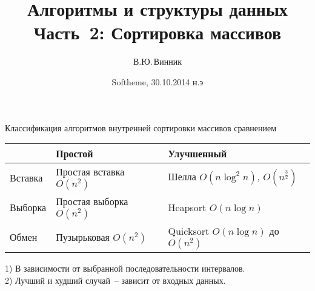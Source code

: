 \documentclass[landscape]{slides}
\begin{document}
\author{В.Ю.\,Винник}

\title{Алгоритмы и структуры данных\\
Часть~2: Сортировка массивов}

\date{Softheme, 30.10.2014 н.э}

\maketitle

\begin{slide}
  Классификация алгоритмов внутренней сортировки массивов сравнением
  \begin{center}
    \renewcommand{\arraystretch}{2}
    \begin{tabular}{|l|l|l|}
      \hline
      {}&
      Простой&
      Улучшенный
      \\
      \hline
      Вставка&
      Простая вставка $O(n^2)$&
      Шелла\textonesuperior{} $O(n\log^2n)$, $O(n^\frac{3}{2})$
      \\
      \hline
      Выборка&
      Простая выборка $O(n^2)$&
      Heapsort $O(n\log n)$
      \\
      \hline
      Обмен&
      Пузырьковая $O(n^2)$&
      Quicksort\texttwosuperior{} $O(n\log n)$ до $O(n^2)$
      \\
      \hline
    \end{tabular}
  \end{center}
  1) В зависимости от выбранной последовательности интервалов.\\
  2) Лучший и худший случай~-- зависит от входных данных.
\end{slide}
\end{document}
